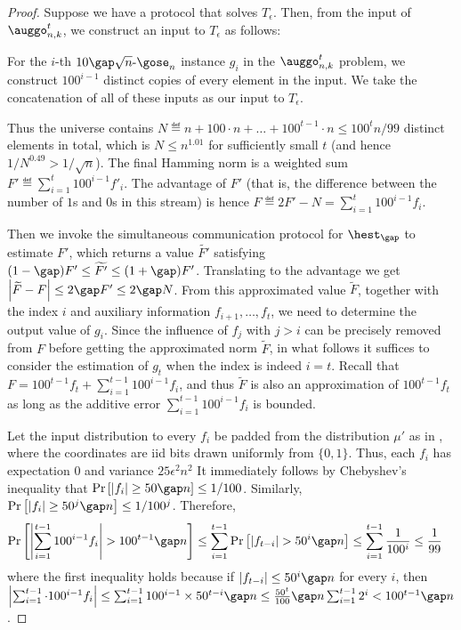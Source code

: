 \begin{proof}

{\color{black}Suppose we have a protocol that solves $T_\epsilon$. Then, from the input of $\auggo_{n,k}^t$, we construct an input to $T_\epsilon$ as follows:

For the $i$-th $10\text{$\gap\sqrt{n}$-$\gose_n$}$ instance $g_i$ in the $\auggo_{n,k}^{t}$ problem, we construct $100^{i-1}$ distinct copies of every element in the input. We take the concatenation of all of these inputs as our input to $T_\epsilon$.}
	Thus the universe contains $N\eqdef n+100\cdot n+\dots+100^{t-1}\cdot n \le 100^t n/99$ distinct elements in total, which is $N\le n^{1.01}$ for sufficiently small $t$ (and hence $1/N^{0.49}>1/\sqrt{n}$).
	The final Hamming norm is a weighted sum $F'\eqdef \sum_{i=1}^t 100^{i-1} f'_i$.
	The advantage of $F'$ {\color{black}(that is, the difference between the number of $1$s and $0$s in this stream)} is hence $F \eqdef 2F'-N = \sum_{i=1}^t 100^{i-1} f_i$. 

	Then we invoke the simultaneous communication protocol for $\hest_\gap$ to estimate $F'$, which returns a value $\widetilde{F'}$ satisfying 
	$(1-\gap)F' \le \widetilde{F'} \le (1+\gap)F'$.
	Translating to the advantage we get $\left| \widetilde{F} -  F \right| \le 2\gap F' \le 2\gap N$.
	From this approximated value $\widetilde{F}$, together with the index $i$ and auxiliary information $f_{i+1},\dots, f_t$, we need to determine the output value of $g_i$.
	Since the influence of $f_{j}$ with $j>i$ can be precisely removed from $F$ before getting the approximated norm $\widetilde{F}$, in what follows it suffices to consider the estimation of $g_t$ when the index is indeed $i=t$.
	Recall that $F = 100^{t-1} f_t + \sum_{i=1}^{t-1} 100^{i-1} f_i$,
	and thus $\widetilde{F}$ is also an approximation of $100^{t-1} f_t$ as long as the additive error $\sum_{i=1}^{t-1} 100^{i-1} f_i$ is bounded.

	Let the input distribution to every $f_i$ be padded from the  distribution $\mu'$ as in , where the coordinates are iid bits drawn uniformly from $\{0,1\}$. Thus, each $f_i$ has expectation $0$ and variance $25\epsilon^2n^2$
	It immediately follows by Chebyshev's inequality that $\Pr\left[|f_i|\ge 50 \gap n\right] \le 1/100$.
	Similarly, $\Pr\left[|f_{i}|\ge 50^j \gap n\right] \le 1/100^j$.
	Therefore,
	\begin{align}
		\Pr\left[ \left|\sum_{i=1}^{t-1} 100^{i-1} f_i \right|>  100^{t-1}\gap n\right] 
		& \le \sum_{i=1}^{t-1} \Pr\left[ \left|f_{t-i}\right| >  50^i \gap n \right]
		\le \sum_{i=1}^{t-1} \frac{1}{100^i} \le \frac{1}{99}
	\end{align}
	where the first inequality holds because if $\left|f_{t-i}\right| \le 50^i \gap n $ for every $i$, then $ \left|\sum_{i=1}^{t-1} \cdot 100^{i-1} f_i \right|\le \sum_{i=1}^{t-1} 100^{i-1}\times 50^{t-i} \gap n\le \frac{50^t}{100}\gap n\sum_{i=1}^{t-1} 2^i < 100^{t-1}\gap n$.


\end{proof}
